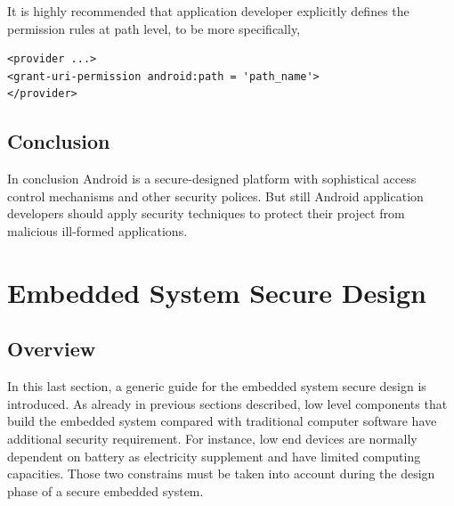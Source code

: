 It is highly recommended that application developer explicitly defines the permission rules at path level, to be more specifically\cite{android_secure_cook}, 
\begin{Verbatim}[fontsize=\relsize{-1},frame=lines,framesep=4mm, label=\fbox{\small\emph{'Content Path Securing}}]
<provider ...>
<grant-uri-permission android:path = 'path_name'>
</provider>
\end{Verbatim} 
\subsection{Conclusion}
In conclusion Android is  a secure-designed platform with sophistical access control mechanisms and other security polices. But still Android  application developers should apply security techniques to protect their project from malicious ill-formed applications.
\section{Embedded System Secure Design}
\subsection{Overview}
In this last section,  a generic guide for the embedded system secure design is introduced. As already in previous sections described, low level components that build the embedded system compared with traditional  computer software have additional security requirement. For instance, low end devices are normally dependent on battery as electricity supplement and have limited computing capacities. Those two constrains must be taken into account during the design phase of a secure embedded system.
